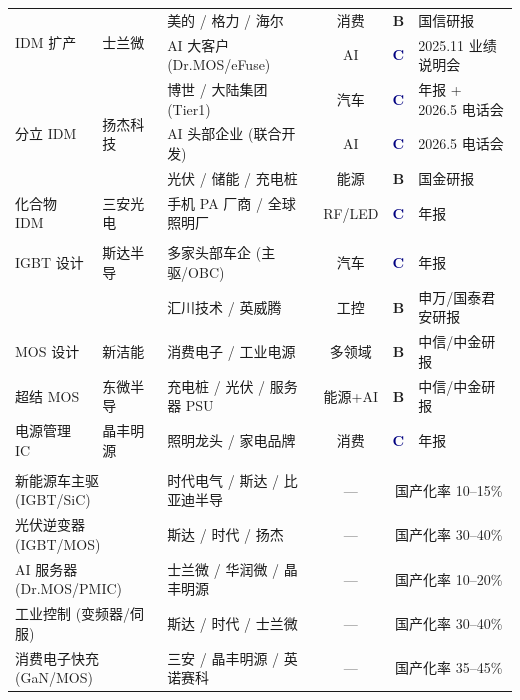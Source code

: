 \begin{exhibitbox}[表 2-4：功率半导体核心公司供应链关系矩阵]
\begin{tabular}{@{}lllccl@{}}
\multirow{2}{*}{IDM 扩产} & \multirow{2}{*}{士兰微} & 美的 / 格力 / 海尔 & 消费 & \textcolor{riskgreen}{\textbf{B}} & 国信研报 \\
& & AI 大客户 (Dr.MOS/eFuse) & AI & \textcolor{navy}{\textbf{C}} & 2025.11 业绩说明会 \\
\multirow{3}{*}{分立 IDM} & \multirow{3}{*}{扬杰科技} & 博世 / 大陆集团 (Tier1) & 汽车 & \textcolor{navy}{\textbf{C}} & 年报 + 2026.5 电话会 \\
& & AI 头部企业 (联合开发) & AI & \textcolor{navy}{\textbf{C}} & 2026.5 电话会 \\
& & 光伏 / 储能 / 充电桩 & 能源 & \textcolor{riskgreen}{\textbf{B}} & 国金研报 \\
化合物 IDM & 三安光电 & 手机 PA 厂商 / 全球照明厂 & RF/LED & \textcolor{navy}{\textbf{C}} & 年报 \\
\midrule
\rowcolor{accentblue!5}
\multicolumn{6}{l}{\textit{中游设计 $\rightarrow$ 下游应用 (Fabless 模式)}} \\
IGBT 设计 & 斯达半导 & 多家头部车企 (主驱/OBC) & 汽车 & \textcolor{navy}{\textbf{C}} & 年报 \\
& & 汇川技术 / 英威腾 & 工控 & \textcolor{riskgreen}{\textbf{B}} & 申万/国泰君安研报 \\
MOS 设计 & 新洁能 & 消费电子 / 工业电源 & 多领域 & \textcolor{riskgreen}{\textbf{B}} & 中信/中金研报 \\
超结 MOS & 东微半导 & 充电桩 / 光伏 / 服务器 PSU & 能源+AI & \textcolor{riskgreen}{\textbf{B}} & 中信/中金研报 \\
电源管理 IC & 晶丰明源 & 照明龙头 / 家电品牌 & 消费 & \textcolor{navy}{\textbf{C}} & 年报 \\
\midrule
\rowcolor{riskgreen!5}
\multicolumn{6}{l}{\textit{下游应用领域国产化率一览}} \\
\multicolumn{2}{l}{新能源车主驱 (IGBT/SiC)} & 时代电气 / 斯达 / 比亚迪半导 & — & \multicolumn{2}{c}{国产化率 10--15\%} \\
\multicolumn{2}{l}{光伏逆变器 (IGBT/MOS)} & 斯达 / 时代 / 扬杰 & — & \multicolumn{2}{c}{国产化率 30--40\%} \\
\multicolumn{2}{l}{AI 服务器 (Dr.MOS/PMIC)} & 士兰微 / 华润微 / 晶丰明源 & — & \multicolumn{2}{c}{国产化率 10--20\%} \\
\multicolumn{2}{l}{工业控制 (变频器/伺服)} & 斯达 / 时代 / 士兰微 & — & \multicolumn{2}{c}{国产化率 30--40\%} \\
\multicolumn{2}{l}{消费电子快充 (GaN/MOS)} & 三安 / 晶丰明源 / 英诺赛科 & — & \multicolumn{2}{c}{国产化率 35--45\%} \\
\bottomrule
\end{tabular}
\vspace{0.2cm}
\end{exhibitbox}

